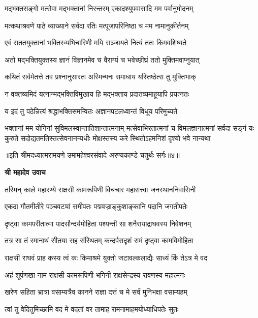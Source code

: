 \twolineshloka
{मद्भक्तसङ्गो मत्सेवा मद्भक्तानां निरन्तरम्}
{एकादश्युपवासादि मम पर्वानुमोदनम्} %

\twolineshloka
{मत्कथाश्रवणे पाठे व्याख्याने सर्वदा रतिः}
{मत्पूजापरिनिष्ठा च मम नामानुकीर्तनम्} %

\twolineshloka
{एवं सततयुक्तानां भक्तिरव्यभिचारिणी}
{मयि सञ्जायते नित्यं ततः किमवशिष्यते} %

\twolineshloka
{अतो मद्भक्तियुक्तस्य ज्ञानं विज्ञानमेव च}
{वैराग्यं च भवेच्छीघ्रं ततो मुक्तिमवाप्नुयात्} %

\twolineshloka
{कथितं सर्वमेतत्ते तव प्रश्नानुसारतः}
{अस्मिन्मनः समाधाय यस्तिष्ठेत्स तु मुक्तिभाक्} %

\twolineshloka
{न वक्तव्यमिदं यत्नान्मद्भक्तिविमुखाय हि}
{मद्भक्ताय प्रदातव्यमाहूयापि प्रयत्नतः} %

\twolineshloka
{य इदं तु पठेन्नित्यं श्रद्धाभक्तिसमन्वितः}
{अज्ञानपटलध्वान्तं विधूय परिमुच्यते} %

\fourlineindentedshloka
{भक्तानां मम योगिनां सुविमलस्वान्तातिशान्तात्मनाम्}
{मत्सेवाभिरतात्मनां च विमलज्ञानात्मनां सर्वदा}
{सङ्गं यः कुरुते सदोद्यतमतिस्तत्सेवनानन्यधीः}
{मोक्षस्तस्य करे स्थितोऽहमनिशं दृश्यो भवे नान्यथा} %

{॥इति श्रीमदध्यात्मरामयणे उमामहेश्वरसंवादे
अरण्यकाण्डे चतुर्थः सर्गः॥४॥
}




\textbf{श्री महादेव उवाच}

\twolineshloka
{तस्मिन् काले महारण्ये राक्षसी कामरूपिणी}
{विचचार महासत्त्वा जनस्थाननिवासिनी} %

\twolineshloka
{एकदा गौतमीतीरे पञ्चवट्यां समीपतः}
{पद्मवज्राङ्कुशाङ्कानि पदानि जगतीपतेः} %

\twolineshloka
{दृष्ट्वा कामपरीतात्मा पादसौन्दर्यमोहिता}
{पश्यन्ती सा शनैरायाद्राघवस्य निवेशनम्} %

\twolineshloka
{तत्र सा तं रमानाथं सीतया सह संस्थितम्}
{कन्दर्पसदृशं रामं दृष्ट्वा कामविमोहिता} %

\twolineshloka
{राक्षसी राघवं प्राह कस्य त्वं कः किमाश्रमे}
{युक्तो जटावल्कलाद्यैः साध्यं किं तेऽत्र मे वद} %

\twolineshloka
{अहं शूर्पणखा नाम राक्षसी कामरूपिणी}
{भगिनी राक्षसेन्द्रस्य रावणस्य महात्मनः} %

\twolineshloka
{खरेण सहिता भ्रात्रा वसाम्यत्रैव कानने}
{राज्ञा दत्तं च मे सर्वं मुनिभक्षा वसाम्यहम्} %

\twolineshloka
{त्वां तु वेदितुमिच्छामि वद मे वदतां वर}
{तामाह रामनामाहमयोध्याधिपतेः सुतः} %

